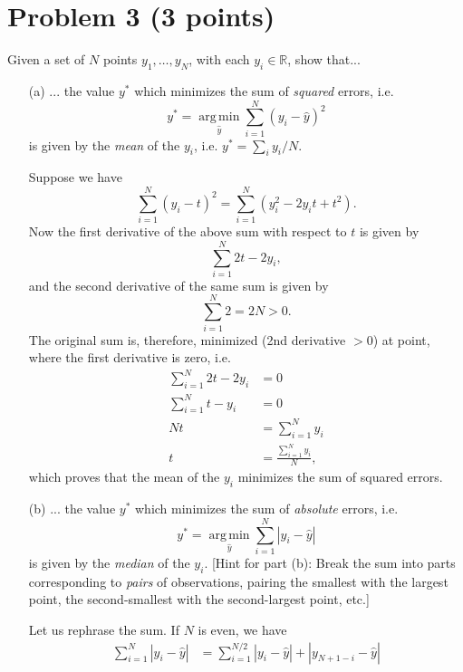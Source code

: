 \documentclass[10pt]{article}
\DeclareMathOperator*{\argmin}{arg\, min}
\begin{document}
\color{blue}
\section*{Problem 3 (3 points)}
Given a set of $N$ points $y_1, \dots, y_N$, with each $y_i \in \mathbb{R}$, show that...
\begin{itemize}
  \item[(a)] ... the value $y^{\ast}$ which minimizes the sum of \textit{squared} errors, i.e.
 \[
 y^{\ast} = \underset{\hat{y}}{\argmin} \sum_{i = 1}^N (y_i - \hat{y})^2
 \]
 is given by the \textit{mean} of the $y_i$, i.e. $y^\ast = \sum_i y_i / N$.
 
 \color{black} 
 Suppose we have 
 \[
 \sum_{i = 1}^N (y_i - t)^2 = \sum_{i = 1}^N (y_i^2 - 2y_it + t^2).
 \]
 Now the first derivative of the above sum with respect to $t$ is given by
 \[
 \sum_{i = 1}^N 2t - 2y_i,
 \]
 and the second derivative of the same sum is given by
 \[
 \sum_{i = 1}^N 2 = 2N > 0.
 \]
 The original sum is, therefore, minimized (2nd derivative $> 0$) at point, where the first derivative is zero, i.e.
 \begin{align*}
 \sum_{i = 1}^N 2t - 2y_i &= 0 \\
 \sum_{i = 1}^N t - y_i &= 0 \\
 Nt &= \sum_{i = 1}^N y_i \\
 t &= \frac{\sum_{i = 1}^N y_i}{N},
 \end{align*}
 which proves that the mean of the $y_i$ minimizes the sum of squared errors.
 
 \color{blue}
 \item[(b)] ... the value $y^{\ast}$ which minimizes the sum of \textit{absolute} errors, i.e.
 \[
 y^\ast = \underset{\hat{y}}{\argmin} \sum_{i = 1}^N |y_i - \hat{y}|
 \] 
 is given by the \textit{median} of the $y_i$. [Hint for part (b): Break the sum into parts corresponding to \textit{pairs} of observations, pairing the smallest with the largest point, the second-smallest with the second-largest point, etc.]
 
 \color{black}
 Let us rephrase the sum. If $N$ is even, we have
 \begin{align*}
 \sum_{i = 1}^N |y_i - \hat{y}| &= \sum_{i = 1}^{N / 2} |y_i - \hat{y}| + |y_{N + 1 - i} - \hat{y}|
 \end{align*}
\end{itemize}

\color{blue}
\end{document}

